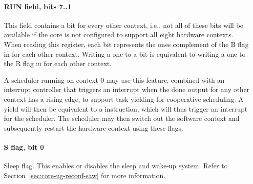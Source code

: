 \paragraph*{RUN field, bits 7..1}
This field contains a bit for every other context, i.e., not all of these bits
will be available if the core is not configured to support all eight hardware
contexts. When reading this register, each bit represents the ones complement
of the B flag in  for each other context. Writing a one to a bit is
equivalent to writing a one to the R flag in  for each other context.

A scheduler running on context 0 may use this feature, combined with an
interrupt controller that triggers an interrupt when the done output for any
other context has a rising edge, to support task yielding for cooperative
scheduling. A yield will then be equivalent to a  instruction, which
will thus trigger an interrupt for the scheduler. The scheduler may then
switch out the software context and subsequently restart the hardware context
using these flags.
\paragraph*{S flag, bit 0}
Sleep flag. This enables or disables the sleep and wake-up system. Refer to
Section~\ref{sec:core-ug-reconf-saw} for more information.

